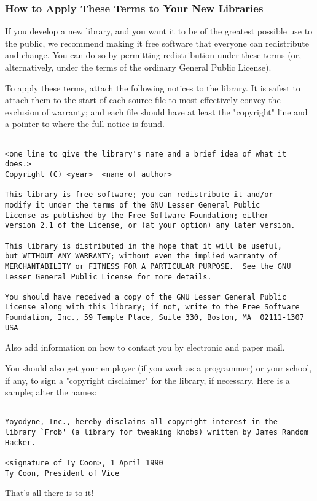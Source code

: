 \subsubsection*{How to Apply These Terms to Your New Libraries}

If you develop a new library, and you want it to be of the greatest
possible use to the public, we recommend making it free software that
everyone can redistribute and change.  You can do so by permitting
redistribution under these terms (or, alternatively, under the terms
of the ordinary General Public License).

To apply these terms, attach the following notices to the library.  It
is safest to attach them to the start of each source file to most
effectively convey the exclusion of warranty; and each file should
have at least the "copyright" line and a pointer to where the full
notice is found.

{\small
\begin{verbatim}

<one line to give the library's name and a brief idea of what it does.>
Copyright (C) <year>  <name of author>

This library is free software; you can redistribute it and/or
modify it under the terms of the GNU Lesser General Public
License as published by the Free Software Foundation; either
version 2.1 of the License, or (at your option) any later version.

This library is distributed in the hope that it will be useful,
but WITHOUT ANY WARRANTY; without even the implied warranty of
MERCHANTABILITY or FITNESS FOR A PARTICULAR PURPOSE.  See the GNU
Lesser General Public License for more details.

You should have received a copy of the GNU Lesser General Public
License along with this library; if not, write to the Free Software
Foundation, Inc., 59 Temple Place, Suite 330, Boston, MA  02111-1307  USA
\end{verbatim}
}

Also add information on how to contact you by electronic and paper mail.

You should also get your employer (if you work as a programmer) or your
school, if any, to sign a "copyright disclaimer" for the library, if
necessary.  Here is a sample; alter the names:

{\small
\begin{verbatim}

Yoyodyne, Inc., hereby disclaims all copyright interest in the
library `Frob' (a library for tweaking knobs) written by James Random Hacker.

<signature of Ty Coon>, 1 April 1990
Ty Coon, President of Vice
\end{verbatim}
}

That's all there is to it!



